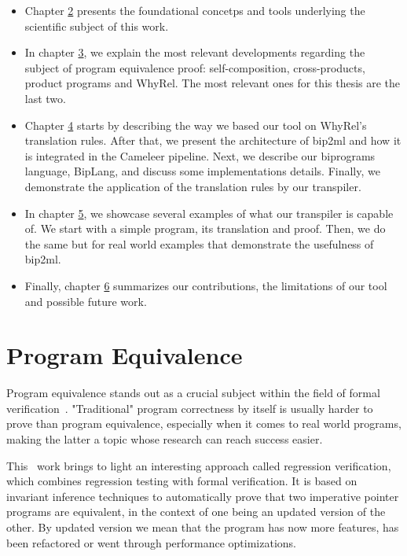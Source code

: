 \begin{itemize}
    \setlength\itemsep{0.1em}
    \item Chapter \hyperref[cha:background]{2} presents the foundational concetps and tools underlying the scientific subject of this work.

    \item In chapter \hyperref[cha:state_of_the_art]{3}, we explain the most relevant developments regarding the subject of program equivalence proof: self-composition, cross-products, product programs and WhyRel.
    The most relevant ones for this thesis are the last two.

    \item Chapter \hyperref[cha:methodology]{4} starts by describing the way we based our tool on WhyRel's translation rules.
    After that, we present the architecture of bip2ml and how it is integrated in the Cameleer pipeline.
    Next, we describe our biprograms language, BipLang, and discuss some implementations details.
    Finally, we demonstrate the application of the translation rules by our transpiler.

    \item In chapter \hyperref[cha:case_studies]{5}, we showcase several examples of what our transpiler is capable of. 
    We start with a simple program, its translation and proof.
    Then, we do the same but for real world examples that demonstrate the usefulness of bip2ml.
    
    \item Finally, chapter \hyperref[cha:conclusion]{6} summarizes our contributions, the limitations of our tool and possible future work.
\end{itemize}




\iffalse
\section{Program Equivalence}
\label{sec:program_equivalence}

Program equivalence stands out as a crucial subject within the field of formal verification~\cite{DBLP:journals/fmsd/Strichman18}.
"Traditional" program correctness by itself is usually harder to prove than program equivalence, especially when it comes to real world programs, making the latter a topic whose research can reach success easier.

This~\cite{DBLP:journals/fmsd/KlebanovRU18} work brings to light an interesting approach called regression verification, which combines regression testing with formal verification.
It is based on invariant inference techniques to automatically prove that two imperative pointer programs are equivalent, in the context of one being an updated version of the other.
By updated version we mean that the program has now more features, has been refactored or went through performance optimizations.

